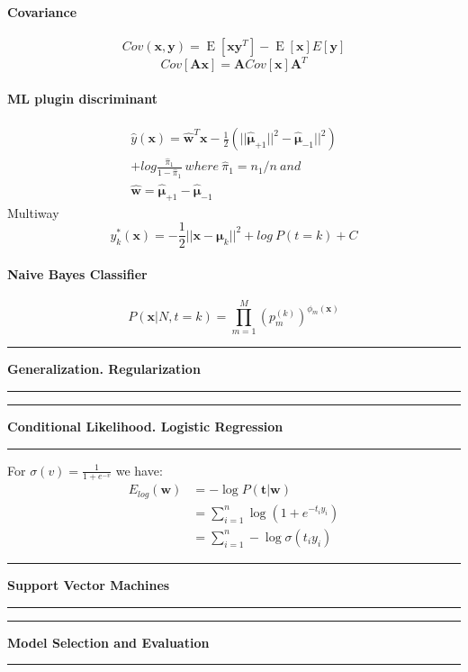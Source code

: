 \documentclass[7pt]{scrartcl}
\newlength{\secskip}
\renewcommand{\section}[1]{
  \vspace{\secskip}
  \hrule\vspace{.4em}
  \textbf{#1}
  \vspace{.4em}
  \hrule
  \vspace{\secskip}
}
\DeclareMathOperator{\E}{E}
\renewcommand{\vec}{\mathbf}
\begin{document}
\begin{multicols}{4}
\paragraph{Covariance}
$$Cov(\vec x, \vec y) = \E[\vec x \vec y ^ T] - \E[\vec x]E[\vec y]$$
$$Cov[\vec A \vec x] = \vec A Cov[\vec x] \vec A^T$$

\paragraph{ML plugin discriminant}
\begin{equation*}
\begin{split}
\hat{y}(\vec{x}) = \hat{\vec{w}}^T \vec{x} - \frac{1}{2}(||\hat{\vec{\mu}}_{+1} ||^2 - \hat{\vec{\mu}}_{-1} ||^2) \\ + log\frac{\hat{\pi}_1}{1-\hat{\pi}_1} ~ where~ \hat{\pi}_1 = n_1 / n ~ and~  \\ \hat{\vec{w}}=\hat{\vec{\mu}}_{+1} - \hat{\vec{\mu}}_{-1}
\end{split}
\end{equation*}
Multiway \[y_k^*(\vec{x}) = -\frac{1}{2}||\vec{x}-\vec{\mu}_k||^2 + log~P(t=k) + C\]

\paragraph{Naive Bayes Classifier}
\[ P(\vec x | N,t=k) = \prod_{m=1}^M \left ( p_m^{(k)} \right
)^{\phi_m(\vec x)} \]

\section{Generalization. Regularization}
\section{Conditional Likelihood. Logistic Regression}
For $\sigma(v) = \frac{1}{1+e^{-v}}$ we have:
\begin{align*}
 E_{log}(\vec w) &= - \log P(\vec t | \vec w)\\
 &= \sum\nolimits_{i=1}^n \log \left (1 + e^{-t_iy_i} \right)\\
 &= \sum\nolimits_{i=1}^n -\log \sigma (t_iy_i)
\end{align*}
\section{Support Vector Machines}
\section{Model Selection and Evaluation}

\end{multicols}
\end{document}
